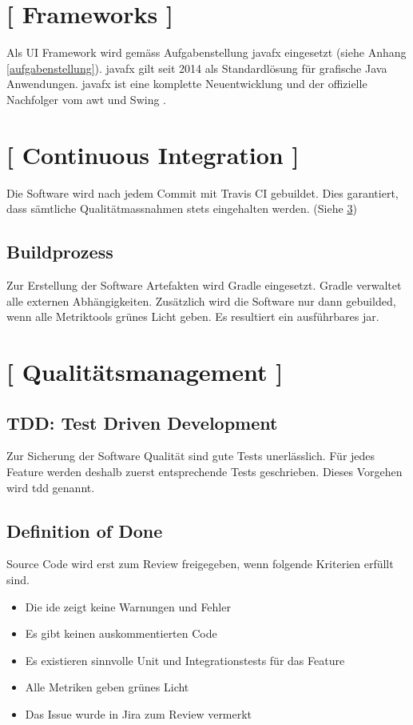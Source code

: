 \documentclass[11pt,a4paper,english,oneside]{book}
\numberwithin{equation}{chapter}
\begin{document}
	\section{ [ Frameworks ] }
	Als UI Framework wird gemäss Aufgabenstellung \gls{javafx} eingesetzt (siehe Anhang \ref{aufgabenstellung}). \gls{javafx} gilt seit 2014 als Standardlösung für grafische Java Anwendungen. \gls{javafx} ist eine komplette Neuentwicklung und der offizielle Nachfolger vom \gls{awt} \cite{awt} und Swing \cite{swing}. 

	
	\section{ [ Continuous Integration ] }
	Die Software wird nach jedem Commit mit Travis CI \cite{travisci} gebuildet. Dies garantiert, dass sämtliche Qualitätmassnahmen stets eingehalten werden. (Siehe \ref{sec:qualitymeasures})
	
	\subsection{Buildprozess}
	\label{sec:buildprocess}
	Zur Erstellung der Software Artefakten wird Gradle \cite{gradle} eingesetzt. Gradle verwaltet alle externen Abhängigkeiten. Zusätzlich wird die Software nur dann gebuilded, wenn alle Metriktools grünes Licht geben. Es resultiert ein ausführbares \gls{jar}. 
		
	\section{ [ Qualitätsmanagement ] }
	\label{sec:qualitymeasures}
	
	\subsection{TDD: Test Driven Development}
	Zur Sicherung der Software Qualität sind gute Tests unerlässlich. Für jedes Feature werden deshalb zuerst entsprechende Tests geschrieben. Dieses Vorgehen wird \gls{tdd} genannt.
	
	\subsection{Definition of Done}
	Source Code wird erst zum Review freigegeben, wenn folgende Kriterien erfüllt sind.
	\begin{itemize}
		\item Die \gls{ide} zeigt keine Warnungen und Fehler
		\item Es gibt keinen auskommentierten Code
		\item Es existieren sinnvolle Unit und Integrationstests für das Feature
		\item Alle Metriken geben grünes Licht
		\item Das Issue wurde in Jira \cite{jira} zum Review vermerkt
	\end{itemize}
		
\end{document}
